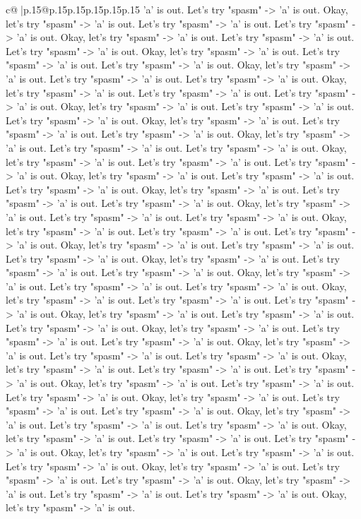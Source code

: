\documentclass{article}
\begin{document}
{\begin{supertabular}{c@{$\;$}|p{.15\linewidth}@{}p{.15\linewidth}p{.15\linewidth}p{.15\linewidth}p{.15\linewidth}p{.15\linewidth}}
{{{'a' is out. Let's try "spasm" {-}> 'a' is out. Okay, let's try "spasm" {-}> 'a' is out. Let's try "spasm" {-}> 'a' is out. Let's try "spasm" {-}> 'a' is out. Okay, let's try "spasm" {-}> 'a' is out. Let's try "spasm" {-}> 'a' is out. Let's try "spasm" {-}> 'a' is out. Okay, let's try "spasm" {-}> 'a' is out. Let's try "spasm" {-}> 'a' is out. Let's try "spasm" {-}> 'a' is out. Okay, let's try "spasm" {-}> 'a' is out. Let's try "spasm" {-}> 'a' is out. Let's try "spasm" {-}> 'a' is out. Okay, let's try "spasm" {-}> 'a' is out. Let's try "spasm" {-}> 'a' is out. Let's try "spasm" {-}> 'a' is out. Okay, let's try "spasm" {-}> 'a' is out. Let's try "spasm" {-}> 'a' is out. Let's try "spasm" {-}> 'a' is out. Okay, let's try "spasm" {-}> 'a' is out. Let's try "spasm" {-}> 'a' is out. Let's try "spasm" {-}> 'a' is out. Okay, let's try "spasm" {-}> 'a' is out. Let's try "spasm" {-}> 'a' is out. Let's try "spasm" {-}> 'a' is out. Okay, let's try "spasm" {-}> 'a' is out. Let's try "spasm" {-}> 'a' is out. Let's try "spasm" {-}> 'a' is out. Okay, let's try "spasm" {-}> 'a' is out. Let's try "spasm" {-}> 'a' is out. Let's try "spasm" {-}> 'a' is out. Okay, let's try "spasm" {-}> 'a' is out. Let's try "spasm" {-}> 'a' is out. Let's try "spasm" {-}> 'a' is out. Okay, let's try "spasm" {-}> 'a' is out. Let's try "spasm" {-}> 'a' is out. Let's try "spasm" {-}> 'a' is out. Okay, let's try "spasm" {-}> 'a' is out. Let's try "spasm" {-}> 'a' is out. Let's try "spasm" {-}> 'a' is out. Okay, let's try "spasm" {-}> 'a' is out. Let's try "spasm" {-}> 'a' is out. Let's try "spasm" {-}> 'a' is out. Okay, let's try "spasm" {-}> 'a' is out. Let's try "spasm" {-}> 'a' is out. Let's try "spasm" {-}> 'a' is out. Okay, let's try "spasm" {-}> 'a' is out. Let's try "spasm" {-}> 'a' is out. Let's try "spasm" {-}> 'a' is out. Okay, let's try "spasm" {-}> 'a' is out. Let's try "spasm" {-}> 'a' is out. Let's try "spasm" {-}> 'a' is out. Okay, let's try "spasm" {-}> 'a' is out. Let's try "spasm" {-}> 'a' is out. Let's try "spasm" {-}> 'a' is out. Okay, let's try "spasm" {-}> 'a' is out. Let's try "spasm" {-}> 'a' is out. Let's try "spasm" {-}> 'a' is out. Okay, let's try "spasm" {-}> 'a' is out. Let's try "spasm" {-}> 'a' is out. Let's try "spasm" {-}> 'a' is out. Okay, let's try "spasm" {-}> 'a' is out. Let's try "spasm" {-}> 'a' is out. Let's try "spasm" {-}> 'a' is out. Okay, let's try "spasm" {-}> 'a' is out. Let's try "spasm" {-}> 'a' is out. Let's try "spasm" {-}> 'a' is out. Okay, let's try "spasm" {-}> 'a' is out. Let's try "spasm" {-}> 'a' is out. Let's try "spasm" {-}> 'a' is out. Okay, let's try "spasm" {-}> 'a' is out. Let's try "spasm" {-}> 'a' is out. Let's try "spasm" {-}> 'a' is out. Okay, let's try "spasm" {-}> 'a' is out. Let's try "spasm" {-}> 'a' is out. Let's try "spasm" {-}> 'a' is out. Okay, let's try "spasm" {-}> 'a' is out. Let's try "spasm" {-}> 'a' is out. Let's try "spasm" {-}> 'a' is out. Okay, let's try "spasm" {-}> 'a' is out. Let's try "spasm" {-}> 'a' is out. Let's try "spasm" {-}> 'a' is out. Okay, let's try "spasm" {-}> 'a' is out. Let's try "spasm" {-}> 'a' is out. Let's try "spasm" {-}> 'a' is out. Okay, let's try "spasm" {-}> 'a' is out. }}}
\end{supertabular}}
\end{document}
